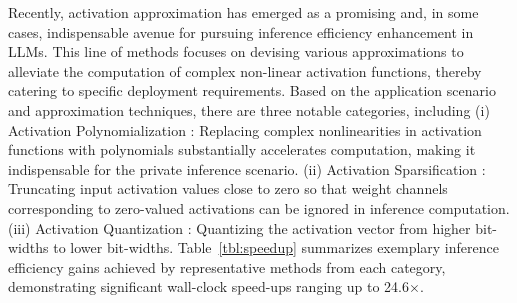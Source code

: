  Recently, activation approximation has emerged as a promising and, in some cases, indispensable avenue for pursuing inference efficiency enhancement in LLMs. This line of methods focuses on devising various approximations to alleviate the computation of complex non-linear activation functions, thereby catering to specific deployment requirements. Based on the application scenario and approximation techniques, there are three notable categories, including (i) Activation Polynomialization \cite{hao2022iron, hou2023ciphergpt, pang2024bolt, lu2023bumblebee, zhang2024secure}: Replacing complex nonlinearities in activation functions with polynomials substantially accelerates computation, making it indispensable for the private inference scenario.
(ii) Activation Sparsification \cite{liu2024training, zhang2024relu, mirzadeh2023relu}: Truncating input activation values close to zero so that weight channels corresponding to zero-valued activations can be ignored in inference computation.
(iii) Activation Quantization \cite{xiao2023smoothquant,shao2023omniquant}: Quantizing the activation vector from higher bit-widths to lower bit-widths.
Table~\ref{tbl:speedup} summarizes exemplary inference efficiency gains achieved by representative methods from each category, demonstrating significant wall-clock speed-ups ranging up to 24.6$\times$. 

